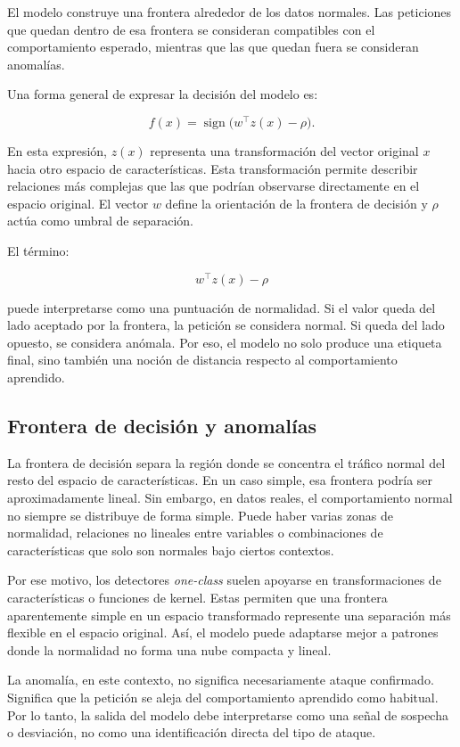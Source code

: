 \documentclass[12pt,oneside]{report}
\begin{document}
El modelo construye una frontera alrededor de los datos normales. Las peticiones que quedan dentro de esa frontera se consideran compatibles con el comportamiento esperado, mientras que las que quedan fuera se consideran anomalías.

Una forma general de expresar la decisión del modelo es:

\[
f(x)=\operatorname{sign}\big(w^\top z(x)-\rho\big).
\]

En esta expresión, $z(x)$ representa una transformación del vector original $x$ hacia otro espacio de características. Esta transformación permite describir relaciones más complejas que las que podrían observarse directamente en el espacio original. El vector $w$ define la orientación de la frontera de decisión y $\rho$ actúa como umbral de separación.

El término:

\[
w^\top z(x)-\rho
\]

puede interpretarse como una puntuación de normalidad. Si el valor queda del lado aceptado por la frontera, la petición se considera normal. Si queda del lado opuesto, se considera anómala. Por eso, el modelo no solo produce una etiqueta final, sino también una noción de distancia respecto al comportamiento aprendido.

\subsection{Frontera de decisión y anomalías}

La frontera de decisión separa la región donde se concentra el tráfico normal del resto del espacio de características. En un caso simple, esa frontera podría ser aproximadamente lineal. Sin embargo, en datos reales, el comportamiento normal no siempre se distribuye de forma simple. Puede haber varias zonas de normalidad, relaciones no lineales entre variables o combinaciones de características que solo son normales bajo ciertos contextos.

Por ese motivo, los detectores \textit{one-class} suelen apoyarse en transformaciones de características o funciones de kernel. Estas permiten que una frontera aparentemente simple en un espacio transformado represente una separación más flexible en el espacio original. Así, el modelo puede adaptarse mejor a patrones donde la normalidad no forma una nube compacta y lineal.

La anomalía, en este contexto, no significa necesariamente ataque confirmado. Significa que la petición se aleja del comportamiento aprendido como habitual. Por lo tanto, la salida del modelo debe interpretarse como una señal de sospecha o desviación, no como una identificación directa del tipo de ataque.
\end{document}
